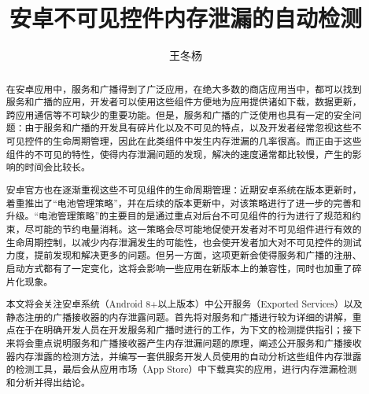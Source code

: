 \documentclass[winfonts]{njuthesis}
\title{安卓不可见控件内存泄漏的自动检测}
\author{王冬杨}
\begin{document}
\maketitle

\begin{abstract}

在安卓应用中，服务和广播得到了广泛应用，在绝大多数的商店应用当中，都可以找到服务和广播的应用，开发者可以使用这些组件方便地为应用提供诸如下载，数据更新，跨应用通信等不可缺少的重要功能。但是，服务和广播的广泛使用也具有一定的安全问题：由于服务和广播的开发具有碎片化以及不可见的特点，以及开发者经常忽视这些不可见控件的生命周期管理，因此在此类组件中发生内存泄漏的几率很高。而正由于这些组件的不可见的特性，使得内存泄漏问题的发现，解决的速度通常都比较慢，产生的影响的时间会比较长。

安卓官方也在逐渐重视这些不可见组件的生命周期管理：近期安卓系统在版本更新时，着重推出了“电池管理策略”，并在后续的版本更新中，对该策略进行了进一步的完善和升级。“电池管理策略”的主要目的是通过重点对后台不可见组件的行为进行了规范和约束，尽可能的节约电量消耗。这一策略会尽可能地促使开发者对不可见组件进行有效的生命周期控制，以减少内存泄漏发生的可能性，也会使开发者加大对不可见控件的测试力度，提前发现和解决更多的问题。但另一方面，这项更新会使得服务和广播的注册、启动方式都有了一定变化，这将会影响一些应用在新版本上的兼容性，同时也加重了碎片化现象。

本文将会关注安卓系统（Android 8+以上版本）中公开服务（Exported Services）以及静态注册的广播接收器的内存泄露问题。首先将对服务和广播进行较为详细的讲解，重点在于在明确开发人员在开发服务和广播时进行的工作，为下文的检测提供指引；接下来将会重点说明服务和广播接收器产生内存泄漏问题的原理，阐述公开服务和广播接收器内存泄露的检测方法，并编写一套供服务开发人员使用的自动分析这些组件内存泄露的检测工具，最后会从应用市场（App Store）中下载真实的应用，进行内存泄漏检测和分析并得出结论。

\end{abstract}

\end{document}
